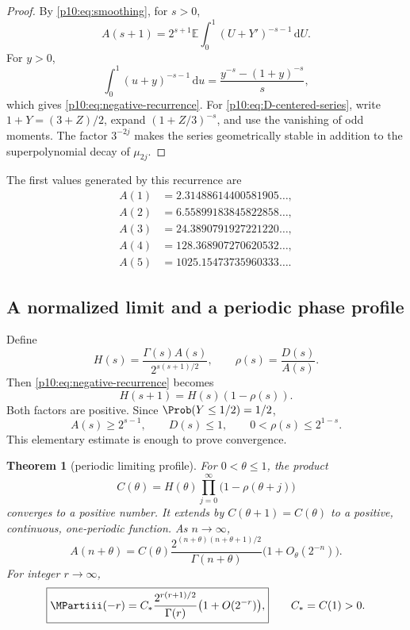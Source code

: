 \documentclass[11pt,oneside]{article}
\newtheorem{theorem}{Theorem}[section]
\theoremstyle{definition}
\theoremstyle{remark}
\newcommand{\E}{\mathbb E}
\newcommand{\dd}{\,\mathrm d}
\newcommand{\1}{\mathbf 1}
\begin{document}
\begin{proof}
By \cref{p10:eq:smoothing}, for \(s>0\),
\[
 A(s+1)=2^{s+1}\E\int_0^1(U+Y')^{-s-1}\dd U.
\]
For \(y>0\),
\[
 \int_0^1(u+y)^{-s-1}\dd u
 =\frac{y^{-s}-(1+y)^{-s}}s,
\]
which gives \cref{p10:eq:negative-recurrence}.  For \cref{p10:eq:D-centered-series}, write
\(1+Y=(3+Z)/2\), expand \((1+Z/3)^{-s}\), and use the vanishing of odd moments.
The factor \(3^{-2j}\) makes the series geometrically stable in addition to the
superpolynomial decay of \(\mu_{2j}\).
\end{proof}

The first values generated by this recurrence are
\begin{align}
 A(1)&=2.31488614400581905\ldots,\nonumber\\
 A(2)&=6.55899183845822858\ldots,\nonumber\\
 A(3)&=24.3890791927221220\ldots,\nonumber\\
 A(4)&=128.368907270620532\ldots,\nonumber\\
 A(5)&=1025.15473735960333\ldots.\label{p10:eq:negative-values}
\end{align}

\subsection{A normalized limit and a periodic phase profile}

Define
\begin{equation}\label{p10:eq:H-def}
 H(s)=\frac{\Gamma(s)A(s)}{2^{s(s+1)/2}},
 \qquad
 \rho(s)=\frac{D(s)}{A(s)}.
\end{equation}
Then \cref{p10:eq:negative-recurrence} becomes
\begin{equation}\label{p10:eq:H-recurrence}
 H(s+1)=H(s)(1-\rho(s)).
\end{equation}
Both factors are positive.  Since \(\Prob(Y\le1/2)=1/2\),
\begin{equation}\label{p10:eq:rho-bound}
 A(s)\ge2^{s-1},\qquad D(s)\le1,
 \qquad 0<\rho(s)\le2^{1-s}.
\end{equation}
This elementary estimate is enough to prove convergence.

\begin{theorem}[periodic limiting profile]\label{p10:thm:phase-limit}
For \(0<\theta\le1\), the product
\begin{equation}\label{p10:eq:Ctheta-product}
 C(\theta)=H(\theta)
 \prod_{j=0}^{\infty}\bigl(1-\rho(\theta+j)\bigr)
\end{equation}
converges to a positive number.  It extends by \(C(\theta+1)=C(\theta)\) to a
positive, continuous, one-periodic function.  As \(n\to\infty\),
\begin{equation}\label{p10:eq:A-phase-asymptotic}
 A(n+\theta)=C(\theta)
 \frac{2^{(n+\theta)(n+\theta+1)/2}}{\Gamma(n+\theta)}
 \bigl(1+O_\theta(2^{-n})\bigr).
\end{equation}
For integer \(r\to\infty\),
\begin{equation}\label{p10:eq:integer-negative-asymptotic}
 \boxed{\displaystyle
 \MPartiii(-r)=C_*\frac{2^{r(r+1)/2}}{\Gamma(r)}
 \bigl(1+O(2^{-r})\bigr),}
 \qquad C_*=C(1)>0.
\end{equation}
\end{theorem}
\end{document}

